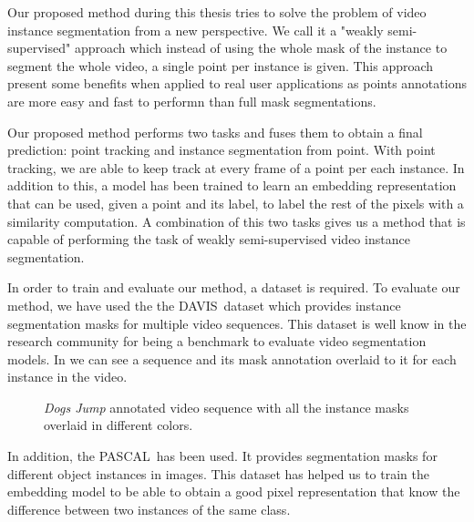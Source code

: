 Our proposed method during this thesis tries to solve the problem of video instance segmentation from a new perspective.
We call it a "weakly semi-supervised" approach which instead of using the whole mask of the instance to segment the whole video, a single point per instance is given.
This approach present some benefits when applied to real user applications as points annotations are more easy and fast to performn than full mask segmentations.

Our proposed method performs two tasks and fuses them to obtain a final prediction: point tracking and instance segmentation from point.
With point tracking, we are able to keep track at every frame of a point per each instance.
In addition to this, a model has been trained to learn an embedding representation that can be used, given a point and its label, to label the rest of the pixels with a similarity computation.
A combination of this two tasks gives us a method
that is capable of performing the task of weakly semi-supervised video instance segmentation.

In order to train and evaluate our method, a dataset is required.
To evaluate our method, we have used the the DAVIS~\davisboth dataset which provides instance segmentation masks for multiple video sequences.
This dataset is well know in the research community for being a benchmark to evaluate video segmentation models.
In  we can see a sequence and its mask annotation overlaid to it for each instance in the video.

\begin{figure}[h]
  \centering
  \caption{\textit{Dogs Jump} annotated video sequence with all the instance masks overlaid in different colors. }
  \label{fig:intro:davis}
\end{figure}

In addition, the PASCAL~\pascal has been used. It provides segmentation masks for different object instances in images. This dataset has helped us to train the embedding model to be able to obtain a good pixel representation that know the difference between two instances of the same class.

